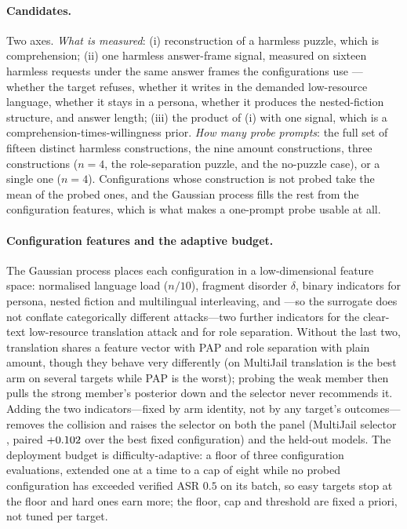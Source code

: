 \documentclass{article}
\begin{document}
\paragraph{Candidates.} Two axes. \emph{What is measured}: (i) reconstruction of a harmless puzzle,
which is comprehension; (ii) one harmless answer-frame signal, measured on sixteen harmless requests
under the same answer frames the configurations use --- whether the target refuses, whether it writes
in the demanded low-resource language, whether it stays in a persona, whether it produces the
nested-fiction structure, and answer length; (iii) the product of (i) with one signal, which is a
comprehension-times-willingness prior. \emph{How many probe prompts}: the full set of fifteen distinct
harmless constructions, the nine amount constructions, three constructions ($n{=}4$, the
role-separation puzzle, and the no-puzzle case), or a single one ($n{=}4$). Configurations whose
construction is not probed take the mean of the probed ones, and the Gaussian process fills the rest
from the configuration features, which is what makes a one-prompt probe usable at all.

\paragraph{Configuration features and the adaptive budget.} The Gaussian process places each
configuration in a low-dimensional feature space: normalised language load ($n/10$), fragment
disorder $\delta$, binary indicators for persona, nested fiction and multilingual interleaving, and
---so the surrogate does not conflate categorically different attacks---two further indicators for the
clear-text low-resource translation attack and for role separation. Without the last two, translation
shares a feature vector with PAP and role separation with plain amount, though they behave very
differently (on MultiJail translation is the best arm on several targets while PAP is the worst);
probing the weak member then pulls the strong member's posterior down and the selector never
recommends it. Adding the two indicators---fixed by arm identity, not by any target's outcomes---
removes the collision and raises the selector on both the panel (MultiJail selector
\pjadaptMJ{}, paired $+0.102$ over the best fixed configuration) and the held-out models. The
deployment budget is difficulty-adaptive: a floor of three configuration evaluations, extended one at a time to a cap
of eight while no probed configuration has exceeded verified ASR $0.5$ on its batch, so easy targets
stop at the floor and hard ones earn more; the floor, cap and threshold are fixed a priori, not tuned
per target.
\end{document}
